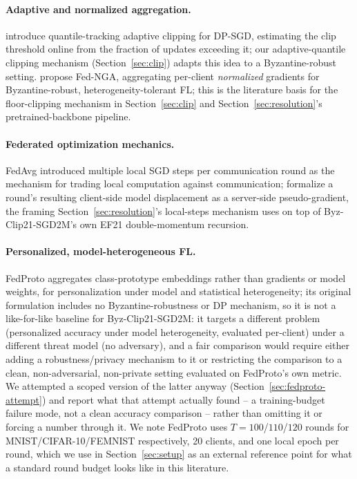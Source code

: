 \documentclass{article}
\begin{document}
\paragraph{Adaptive and normalized aggregation.} \citet{andrew2021adaptive}
introduce quantile-tracking adaptive clipping for DP-SGD, estimating the clip
threshold online from the fraction of updates exceeding it; our adaptive-quantile
clipping mechanism (Section~\ref{sec:clip}) adapts this idea to a Byzantine-robust
setting. \citet{zuo2025fedNGA} propose Fed-NGA, aggregating per-client
\emph{normalized} gradients for Byzantine-robust, heterogeneity-tolerant FL; this
is the literature basis for the floor-clipping mechanism in
Section~\ref{sec:clip} and Section~\ref{sec:resolution}'s pretrained-backbone
pipeline.

\paragraph{Federated optimization mechanics.} FedAvg \citep{mcmahan2017fedavg}
introduced multiple local SGD steps per communication round as the mechanism for
trading local computation against communication; \citet{reddi2021adaptive}
formalize a round's resulting client-side model displacement as a server-side
pseudo-gradient, the framing Section~\ref{sec:resolution}'s local-steps mechanism
uses on top of Byz-Clip21-SGD2M's own EF21 double-momentum recursion.

\paragraph{Personalized, model-heterogeneous FL.} FedProto \citep{tan2022fedproto}
aggregates class-prototype embeddings rather than gradients or model weights, for
personalization under model and statistical heterogeneity; its original
formulation includes no Byzantine-robustness or DP mechanism, so it is not a
like-for-like baseline for Byz-Clip21-SGD2M: it targets a different problem
(personalized accuracy under model heterogeneity, evaluated per-client) under a
different threat model (no adversary), and a fair comparison would require
either adding a robustness/privacy mechanism to it or restricting the
comparison to a clean, non-adversarial, non-private setting evaluated on
FedProto's own metric. We attempted a scoped version of the latter anyway
(Section~\ref{sec:fedproto-attempt}) and report what that attempt actually
found -- a training-budget failure mode, not a clean accuracy comparison --
rather than omitting it or forcing a number through it. We note FedProto uses
$T{=}100$/$110$/$120$ rounds for MNIST/CIFAR-10/FEMNIST respectively, 20
clients, and one local epoch per round, which we use in Section~\ref{sec:setup}
as an external reference point for what a standard round budget looks like in
this literature.
\end{document}
